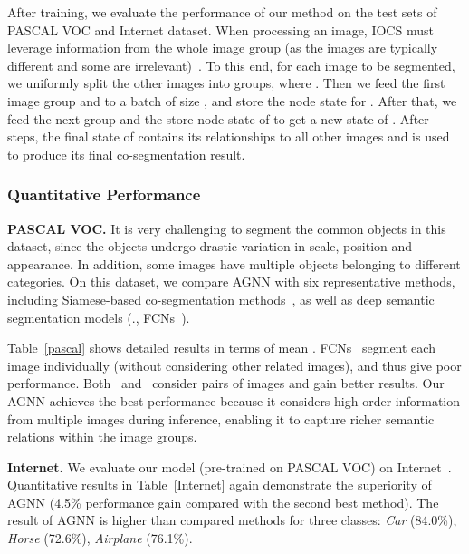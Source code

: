 \documentclass[10pt,twocolumn,letterpaper]{article}
\begin{document}
After training, we evaluate the performance of our method on the test sets of PASCAL VOC and Internet dataset. When processing an image, IOCS must leverage information from the whole image group (as the images are typically different and some are irrelevant)~\cite{quan2016object,vicente2011object}. To this end, for each image  to be segmented, we uniformly split the other  images into  groups, where . Then we feed the first image group and  to a batch of size , and store the node state for . After that, we feed the next group and the store node state of  to get a new state of . After  steps, the final state of  contains its relationships to all other images and is used to produce its final co-segmentation result.

\vspace*{-12pt}
\subsubsection{Quantitative Performance}\label{sec:exqIOCS}
\vspace*{-4pt}
\noindent\textbf{PASCAL VOC.}  It is very challenging to segment the common objects in this dataset, since the objects undergo drastic variation  in scale,  position and appearance. In addition, some images have multiple objects belonging to different categories.  On this dataset, we compare AGNN with six representative methods, including Siamese-based co-segmentation methods~\cite{chen2018semantic,DBLP:journals/corr/abs-1804-06423}, as well as deep semantic segmentation models (\eg., FCNs~\cite{long2015fully}).

Table~\ref{pascal} shows detailed results in terms of mean . FCNs~\cite{long2015fully} segment each image individually (without considering other related images), and thus give poor performance.  Both~\cite{chen2018semantic} and~\cite{DBLP:journals/corr/abs-1804-06423} consider pairs of images and gain better results. Our AGNN achieves the best performance because it considers high-order information from multiple images during inference, enabling it to capture richer semantic relations within the image groups.

\noindent\textbf{Internet.}  We evaluate our model (pre-trained on PASCAL VOC) on Internet~\cite{chen2018semantic,quan2016object}.
Quantitative results in Table~\ref{Internet}  again demonstrate the superiority of AGNN (4.5\% performance gain compared with the second best method). The result of AGNN is higher than compared methods for  three  classes: \textit{Car} (84.0\%), \textit{Horse} (72.6\%), \textit{Airplane} (76.1\%). \vspace*{-12pt}
\end{document}
